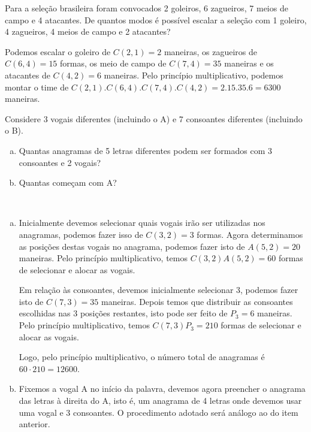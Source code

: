 \documentclass[a4paper, 12pt, addpoints]{exam}
\begin{document}
\begin{questions}
\begin{resp}
\begin{enumerate}[a)]
\end{enumerate}
\end{resp}

\question Para a seleção brasileira foram convocados 2 goleiros, 6 zagueiros, 7
meios de campo e 4 atacantes. De quantos modos é possível escalar a
seleção com 1 goleiro, 4 zagueiros, 4 meios de campo e 2 atacantes?

\begin{resp}
  
  Podemos escalar o goleiro de $C(2,1) = 2$ maneiras, os zagueiros de $C(6,4) = 15$ formas, os meio de campo de $C(7,4) = 35$ maneiras e os atacantes de $C(4,2) = 6$ maneiras. Pelo princípio multiplicativo, podemos montar o time de $C(2,1) . C(6,4) . C(7,4) . C(4,2) = 2 . 15 . 35 . 6 = 6300$ maneiras.
\end{resp}

\question Considere 3 vogais diferentes (incluindo o A) e 7 consoantes diferentes (incluindo o B).

\begin{enumerate}[a)]
    \item Quantas anagramas de 5 letras diferentes podem ser formados com 3 consoantes e 2 vogais?
    \item Quantas começam com A?
\end{enumerate}

\begin{resp}~

  \begin{enumerate}[a)]
    \item Inicialmente devemos selecionar quais vogais irão ser utilizadas nos anagramas, podemos fazer isso de $C(3,2) = 3$ formas. Agora determinamos as posições destas vogais no anagrama, podemos fazer isto de $A(5,2) = 20$ maneiras. Pelo princípio multiplicativo, temos $C(3,2)A(5,2) = 60$ formas de selecionar e alocar as vogais.

    Em relação às consoantes, devemos inicialmente selecionar 3, podemos fazer isto de $C(7,3) = 35$ maneiras. Depois temos que distribuir as consoantes escolhidas nas 3 posições restantes, isto pode ser feito de $P_3 = 6$ maneiras. Pelo princípio multiplicativo, temos $C(7,3)P_3 = 210$ formas de selecionar e alocar as vogais.
    
    Logo, pelo princípio multiplicativo, o número total de anagramas é $60\cdot210 = 12600$.
    
    \item Fixemos a vogal A no início da palavra, devemos agora preencher o anagrama das letras à direita do A, isto é, um anagrama de 4 letras onde devemos usar uma vogal e 3 consoantes. O procedimento adotado será análogo ao do item anterior.
    

\end{enumerate}
\end{resp}
\end{questions}
\end{document}
